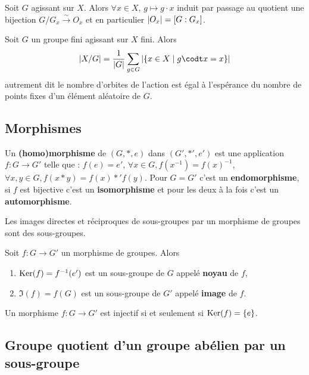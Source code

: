 	\begin{pop}
		Soit $G$ agissant sur $X$.
		Alors $\forall x \in X$, $g \mapsto g \cdot x$ induit par passage au quotient une bijection $G/G_x \overset{\sim}{\to} O_x$ et en particulier $\left\lvert O_x\right\rvert = [G : G_x]$.
	\end{pop}

	\begin{thm}
		Soit $G$ un groupe fini agissant sur $X$ fini.
		Alors
		$$\abs{X/G} = \frac{1}{\abs{G}} \sum_{g \in G} \abs{\{ x \in X \mid g \codt x = x \} }$$
		autrement dit le nombre d'orbites de l'action est égal à l'espérance du nombre de points fixes d'un élément aléatoire de $G$.
	\end{thm}


\subsection{Morphismes}

	\begin{defn}
		Un \textbf{(homo)morphisme} de $(G,*,e)$ dans $(G',*',e')$ est une application $f \colon G \to G'$ telle que : $f(e) = e'$, $\forall x \in G, f(x^{-1}) = f(x)^{-1}$, $\forall x,y \in G, f(x * y) = f(x) *' f(y)$.
		Pour $G = G'$ c'est un \textbf{endomorphisme}, si $f$ est bijective c'est un \textbf{isomorphisme} et pour les deux à la fois c'est un \textbf{automorphisme}.
	\end{defn}

	\begin{pop}
		Les images directes et réciproques de sous-groupes par un morphisme de groupes sont des sous-groupes.
	\end{pop}

	\begin{defn}
		Soit $f \colon G \to G'$ un morphisme de groupes.
		Alors
		\begin{enumerate}
			\item $\operatorname{Ker}(f) = f^{-1}(e')$ est un sous-groupe de $G$ appelé \textbf{noyau} de $f$,
			\item $\Im(f) = f(G)$ est un sous-groupe de $G'$ appelé \textbf{image} de $f$.
		\end{enumerate}
	\end{defn}

	\begin{pop}
		Un morphisme $f \colon G \to G'$ est injectif si et seulement si $\operatorname{Ker}(f) = \{ e \}$.
	\end{pop}


\subsection{Groupe quotient d'un groupe abélien par un sous-groupe}

